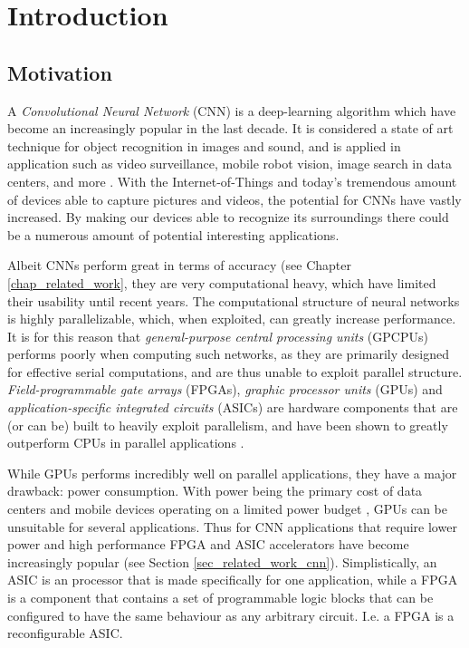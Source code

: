 \chapter{Introduction}

\section{Motivation}

A \textit{Convolutional Neural Network} (CNN) is a deep-learning algorithm which have become an increasingly popular in the last decade. It is considered a state of art technique for object recognition in images and sound, and is applied in application such as video surveillance, mobile robot vision, image search in data centers, and more \cite{Zhang2015} \cite{Farabet2009} \cite{Ji2013} \cite{Ovtcharov2015}. With the Internet-of-Things and today's tremendous amount of devices able to capture pictures and videos, the potential for CNNs have vastly increased. By making our devices able to recognize its surroundings there could be a numerous amount of potential interesting applications.

Albeit CNNs perform great in terms of accuracy (see Chapter \ref{chap_related_work}, they are very computational heavy, which have limited their usability until recent years. The computational structure of neural networks is highly parallelizable, which, when exploited, can greatly increase performance. It is for this reason that \textit{general-purpose central processing units} (GPCPUs) performs poorly when computing such networks, as they are primarily designed for effective serial computations, and are thus unable to exploit parallel structure. \textit{Field-programmable gate arrays} (FPGAs), \textit{graphic processor units} (GPUs) and \textit{application-specific integrated circuits} (ASICs) are hardware components that are (or can be) built to heavily exploit parallelism, and have been shown to greatly outperform CPUs in parallel applications \cite{Chung2010}.

While GPUs performs incredibly well on parallel applications, they have a major drawback: power consumption. With power being the primary cost of data centers and mobile devices operating on a limited power budget \cite{Duranton2013}, GPUs can be unsuitable for several applications. Thus for CNN applications that require lower power and high performance FPGA and ASIC accelerators have become increasingly popular (see Section \ref{sec_related_work_cnn}). Simplistically, an ASIC is an processor that is made specifically for one application,  while a FPGA is a component that contains a set of programmable logic blocks that can be configured to have the same behaviour as any arbitrary circuit. I.e. a FPGA is a reconfigurable ASIC. 

